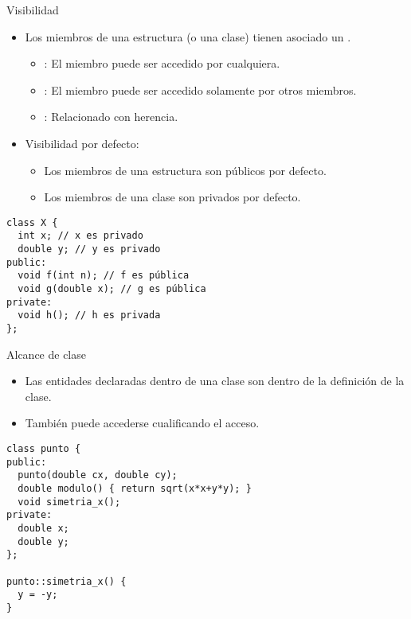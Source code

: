 

\begin{frame}[t,fragile]{Visibilidad}
\begin{itemize}
  \item Los miembros de una estructura (o una clase) tienen asociado 
        un .
    \begin{itemize}
      \item {}: El miembro puede ser accedido por cualquiera.
      \item {}: El miembro puede ser accedido solamente por otros miembros.
      \item {}: Relacionado con herencia.
    \end{itemize}
  \item Visibilidad por defecto:
    \begin{itemize}
      \item Los miembros de una estructura son públicos por defecto.
      \item Los miembros de una clase son privados por defecto.
    \end{itemize}
\end{itemize}
\vspace{-0.25cm}
\begin{lstlisting}
class X {
  int x; // x es privado
  double y; // y es privado
public:
  void f(int n); // f es pública
  void g(double x); // g es pública
private:
  void h(); // h es privada
};
\end{lstlisting}
\end{frame}

\begin{frame}[t,fragile]{Alcance de clase}
\begin{itemize}
  \item Las entidades declaradas dentro de una clase son 
         dentro de la definición de la clase.
  \item También puede accederse cualificando el acceso.
\end{itemize}
\begin{lstlisting}
class punto {
public:
  punto(double cx, double cy);
  double modulo() { return sqrt(x*x+y*y); }
  void simetria_x();
private:
  double x;
  double y;
};

punto::simetria_x() {
  y = -y;
}

\end{lstlisting}
\end{frame}

